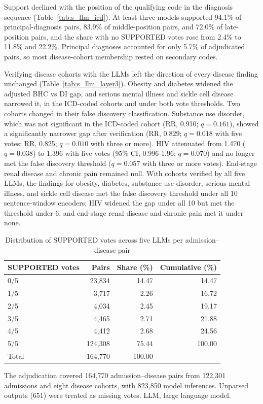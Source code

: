 \documentclass[unnumsec,webpdf,contemporary,large]{oup-authoring-template}
\begin{document}
Support declined with the position of the qualifying code in the diagnosis sequence (Table~\ref{tab:s_llm_icd}). At least three models supported 94.1\% of principal-diagnosis pairs, 83.9\% of middle-position pairs, and 72.0\% of late-position pairs, and the share with no SUPPORTED votes rose from 2.4\% to 11.8\% and 22.2\%. Principal diagnoses accounted for only 5.7\% of adjudicated pairs, so most disease-cohort membership rested on secondary codes.

Verifying disease cohorts with the LLMs left the direction of every disease finding unchanged (Table~\ref{tab:s_llm_layer3}). Obesity and diabetes widened the adjusted BHC vs DI gap, and serious mental illness and sickle cell disease narrowed it, in the ICD-coded cohorts and under both vote thresholds. Two cohorts changed in their false discovery classification. Substance use disorder, which was not significant in the ICD-coded cohort (RR, 0.910; $q=0.161$), showed a significantly narrower gap after verification (RR, 0.829; $q=0.018$ with five votes; RR, 0.825; $q=0.010$ with three or more). HIV attenuated from 1.470 ($q=0.038$) to 1.396 with five votes (95\% CI, 0.996-1.96; $q=0.070$) and no longer met the false discovery threshold ($q=0.057$ with three or more votes). End-stage renal disease and chronic pain remained null. With cohorts verified by all five LLMs, the findings for obesity, diabetes, substance use disorder, serious mental illness, and sickle cell disease met the false discovery threshold under all 10 sentence-window encoders; HIV widened the gap under all 10 but met the threshold under 6, and end-stage renal disease and chronic pain met it under none.

\begin{table}[H]
\caption{Distribution of SUPPORTED votes across five LLMs per admission--disease pair}
\label{tab:s_llm_votes}
\centering
\small
\begin{tabular}{lrrr}
\toprule
SUPPORTED votes & Pairs & Share (\%) & Cumulative (\%) \\
\midrule
0/5 & 23,834 & 14.47 & 14.47 \\
1/5 & 3,717 & 2.26 & 16.72 \\
2/5 & 4,034 & 2.45 & 19.17 \\
3/5 & 4,465 & 2.71 & 21.88 \\
4/5 & 4,412 & 2.68 & 24.56 \\
5/5 & 124,308 & 75.44 & 100.00 \\
\midrule
Total & 164,770 & 100.00 & \\
\bottomrule
\end{tabular}
\begin{tablenotes}
\item The adjudication covered 164,770 admission--disease pairs from 122,301 admissions and eight disease cohorts, with 823,850 model inferences. Unparsed outputs (651) were treated as missing votes. LLM, large language model.
\end{tablenotes}
\end{table}
\end{document}
